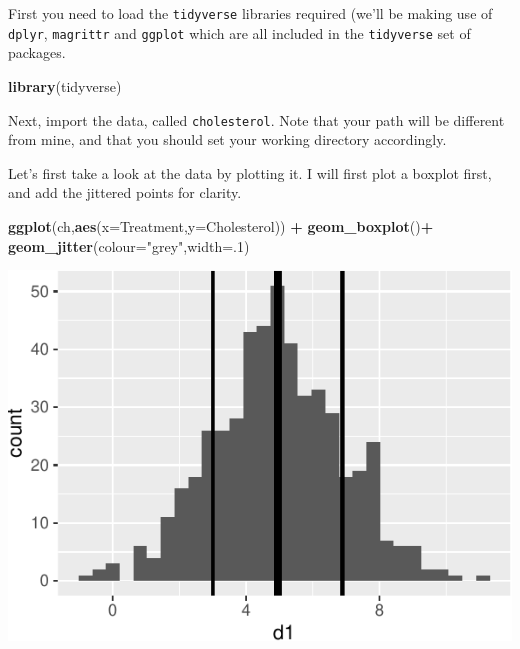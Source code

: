 \documentclass[
  a4paperpaper,
]{book}
\newenvironment{Shaded}{\begin{snugshade}}{\end{snugshade}}
\newcommand{\DataTypeTok}[1]{\textcolor[rgb]{0.13,0.29,0.53}{#1}}
\newcommand{\DecValTok}[1]{\textcolor[rgb]{0.00,0.00,0.81}{#1}}
\newcommand{\KeywordTok}[1]{\textcolor[rgb]{0.13,0.29,0.53}{\textbf{#1}}}
\newcommand{\NormalTok}[1]{#1}
\newcommand{\OperatorTok}[1]{\textcolor[rgb]{0.81,0.36,0.00}{\textbf{#1}}}
\newcommand{\StringTok}[1]{\textcolor[rgb]{0.31,0.60,0.02}{#1}}
\begin{document}
First you need to load the \texttt{tidyverse} libraries required (we'll be making use of \texttt{dplyr}, \texttt{magrittr} and \texttt{ggplot} which are all included in the \texttt{tidyverse} set of packages.

\begin{Shaded}
\begin{Highlighting}[]
\KeywordTok{library}\NormalTok{(tidyverse)}
\end{Highlighting}
\end{Shaded}

Next, import the data, called \texttt{cholesterol}. Note that your path will be different from mine, and that you should set your working directory accordingly.

Let's first take a look at the data by plotting it. I will first plot a boxplot first, and add the jittered points for clarity.

\begin{Shaded}
\begin{Highlighting}[]
\KeywordTok{ggplot}\NormalTok{(ch,}\KeywordTok{aes}\NormalTok{(}\DataTypeTok{x=}\NormalTok{Treatment,}\DataTypeTok{y=}\NormalTok{Cholesterol)) }\OperatorTok{+}\StringTok{ }
\StringTok{      }\KeywordTok{geom\_boxplot}\NormalTok{()}\OperatorTok{+}
\StringTok{    }\KeywordTok{geom\_jitter}\NormalTok{(}\DataTypeTok{colour=}\StringTok{"grey"}\NormalTok{,}\DataTypeTok{width=}\NormalTok{.}\DecValTok{1}\NormalTok{)}
\end{Highlighting}
\end{Shaded}

\includegraphics{BB852_files/figure-latex/unnamed-chunk-136-1.pdf}
\end{document}
